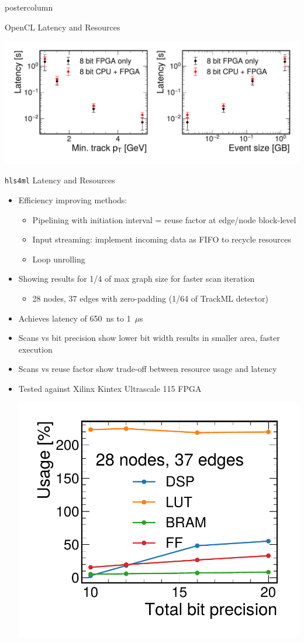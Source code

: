 \documentclass[final,hyperref={pdfpagelabels=false}]{beamer}
\newcommand{\hlsfml}{{\texttt{hls4ml}}\xspace}
\newcommand{\ptmin}{\ensuremath{p_{\mathrm{T_{min}}}}\xspace}
\begin{document}
\begin{frame}
\begin{columns}
\begin{column}{.49\textwidth}
\begin{beamercolorbox}[center,wd=\textwidth]{postercolumn}
\begin{minipage}[T]{.95\textwidth}
{\begin{block}{OpenCL Latency and Resources}
\begin{center}
                \includegraphics[width=0.66\linewidth]{scalability_study_v2.pdf}
              \end{center}
            \end{block}
            
            \begin{block}{{\hlsfml} Latency and Resources}
              \begin{itemize}
                \item Efficiency improving methods:
                \begin{itemize}
                    \item Pipelining with initiation interval = reuse factor at edge/node block-level
                    \item Input streaming: implement incoming data as FIFO to recycle resources
                    \item Loop unrolling
                \end{itemize}
                \vspace{6mm}
                \item Showing results for 1/4 of max graph size for faster scan iteration
                \begin{itemize}
                    \item 28 nodes, 37 edges with zero-padding (1/64 of TrackML detector)
                \end{itemize}
                \item Achieves latency of 650~ns to 1~$\mu$s
                \item Scans vs bit precision show lower bit width results in smaller area, faster execution
                \item Scans vs reuse factor show trade-off between resource usage and latency
                \item Tested against Xilinx Kintex Ultrascale 115 FPGA
                \begin{center}
                    \includegraphics[width=0.33\linewidth]{Resources_vs_BP.pdf}

\end{center}
\end{itemize}
\end{block}}
\end{minipage}
\end{beamercolorbox}
\end{column}
\end{columns}
\end{frame}
\end{document}
